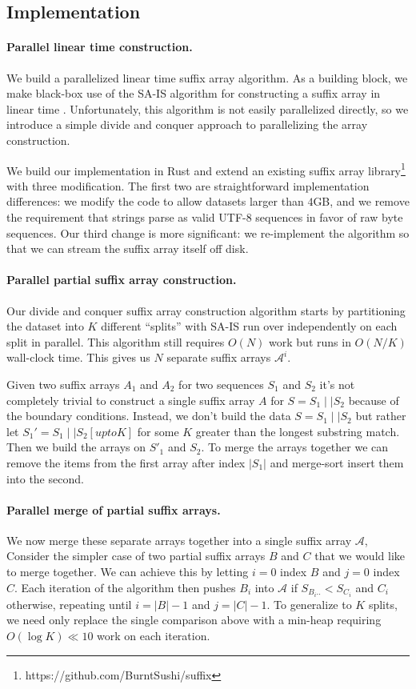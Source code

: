 \subsection{Implementation}
\paragraph{Parallel linear time construction.}
We build a parallelized linear time suffix array algorithm.
%
As a building block, we make black-box use of the SA-IS algorithm for
constructing a suffix array in linear time \citet{nong2009linear,ko2003space}.
%
Unfortunately, this algorithm is not easily parallelized directly, so
we introduce a simple divide and conquer approach to parallelizing the array construction.


We build our implementation in Rust and extend an existing suffix array library\footnote{https://github.com/BurntSushi/suffix}
with three modification.
The first two are straightforward implementation differences:
we modify the code to allow datasets larger than $4$GB,
and we remove the requirement that strings parse as valid UTF-8 sequences in favor of raw byte sequences.
Our third change is more significant: we re-implement the algorithm
so that we can stream the suffix array itself off disk.

\paragraph{Parallel partial suffix array construction.}
%
Our divide and conquer suffix array construction algorithm starts by 
partitioning the dataset into $K$ different ``splits'' with SA-IS run
over independently on each split in parallel.
%
This algorithm still requires $O(N)$ work but runs in $O(N/K)$ wall-clock time.
%
This gives us $N$ separate suffix arrays $\mathcal{A}^i$.

Given two suffix arrays $A_1$ and $A_2$ for two sequences $S_1$ and $S_2$ it's not completely trivial to construct a single suffix array $A$ for $S = S_1 \mid\mid S_2$ 
because of the boundary conditions.
Instead, we don't build the data $S = S_1 \mid\mid S_2$ but rather let $S_1' = S_1 \mid\mid S_2[upto K]$ for some $K$ greater than the longest substring match.
Then we build the arrays on $S'_1$ and $S_2$.
To merge the arrays together we can remove the items from the first array after index $|S_1|$ and merge-sort insert them into the second.

\paragraph{Parallel merge of partial suffix arrays.}
We now merge these separate arrays together into a single suffix array $\mathcal{A}$,
%
Consider the simpler case of two partial suffix arrays $B$ and $C$ that we 
would like to merge together.
%
We can achieve this by letting $i=0$ index $B$ and $j=0$ index $C$.
%
Each iteration of the algorithm then pushes $B_i$ into $\mathcal{A}$ if
$S_{B_i..} < S_{C_i}$ and $C_i$ otherwise, repeating until $i=|B|-1$ and $j=|C|-1$.
%
To generalize to $K$ splits, we need only replace the single comparison above with
a min-heap requiring $O(\log{K}) \ll 10$ work on each iteration.

